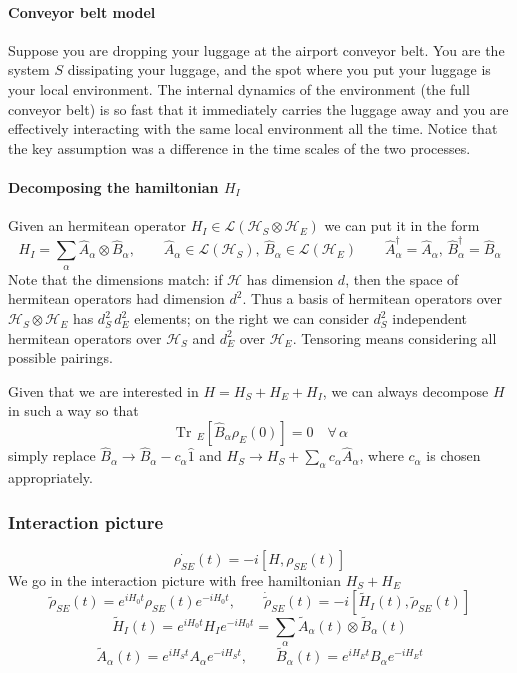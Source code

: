 \documentclass[a4paper, 11pt]{article}
\newcommand{\Tr}{\mathop{\mathrm{Tr}\!}{}}
\newcommand{\HH}{\mathcal{H}}
\newcommand{\LL}{\mathcal{L}}
\begin{document}
	\paragraph{Conveyor belt model} Suppose you are dropping your luggage at the airport conveyor belt. You are the system $S$ dissipating your luggage, and the spot where you put your luggage is your local environment. The internal dynamics of the environment (the full conveyor belt) is so fast that it immediately carries the luggage away and you are effectively interacting with the same local environment all the time. Notice that the key assumption was a difference in the time scales of the two processes.
	
	\paragraph{Decomposing the hamiltonian $H_I$}	
	Given an hermitean operator $H_I\in \LL(\HH_S\otimes \HH_E)$ we can put it in the form
	\[ H_I = \sum_\alpha \hat{A}_\alpha \otimes \hat{B}_\alpha,\qquad \hat{A}_\alpha \in \LL(\HH_S),\,\hat{B}_\alpha \in \LL(\HH_E)
	\qquad \hat{A}_\alpha^\dagger = \hat{A}_\alpha,\, \hat{B}_\alpha^\dagger = \hat{B}_\alpha \]
	Note that the dimensions match: if $\HH$ has dimension $d$, then the space of hermitean operators had dimension $d^2$. Thus a basis of hermitean operators over $\HH_S\otimes \HH_E$ has $d_S^2\, d_E^2$ elements; on the right we can consider $d_S^2$ independent hermitean operators over $\HH_S$ and $d_E^2$ over $\HH_E$. Tensoring means considering all possible pairings.
	
	Given that we are interested in $H=H_S+H_E+H_I$, we can always decompose $H$ in such a way so that
	\[ \Tr_E[\hat{B}_\alpha \rho_E(0)] = 0\quad \forall\,\alpha \]
	simply replace $\hat{B}_\alpha \rightarrow \hat{B}_\alpha - c_\alpha \hat{1}$ and $H_S \rightarrow H_S + \sum_\alpha c_\alpha \hat{A}_\alpha$, where $c_\alpha$ is chosen appropriately.
	
	\subsubsection{Interaction picture}
	\[ \dot{\rho_{SE}}(t) = -i \left[ H, \rho_{SE}(t) \right] \]
	We go in the interaction picture with free hamiltonian $H_S+H_E$
	\[ \tilde{\rho}_{SE}(t) = e^{iH_0 t} \rho_{SE}(t) e^{-iH_0 t}, \qquad \dot{\tilde{\rho}}_{SE}(t) = -i \left[
	\tilde{H}_I(t), \tilde{\rho}_{SE}(t) \right] \]
	\[ \tilde{H}_I(t) = e^{iH_0 t} H_I e^{-iH_0 t} = \sum_\alpha \tilde{A}_\alpha(t) \otimes \tilde{B}_\alpha(t) \]
	\[ \tilde{A}_\alpha(t) = e^{iH_S t} A_\alpha e^{-iH_S t},\qquad \tilde{B}_\alpha(t) = e^{iH_E t} B_\alpha e^{-iH_E t} \]
	
\end{document}
